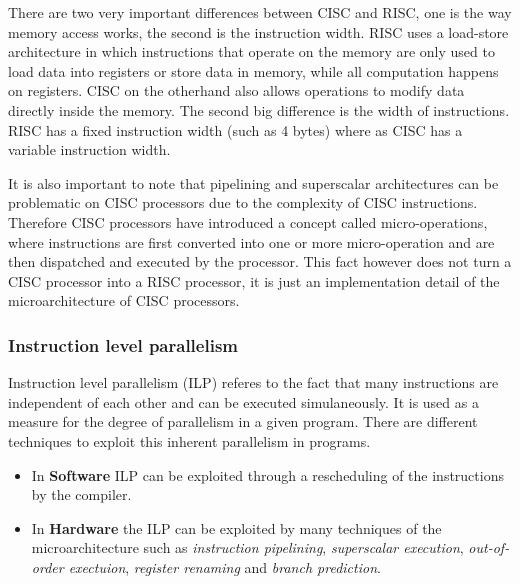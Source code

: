 \documentclass[a4paper,10pt]{article}
\begin{document}
There are two very important differences between CISC and RISC, one is the way memory access works, the second is the instruction width.
RISC uses a load-store architecture in which instructions that operate on the memory are only used to load data into registers or store
data in memory, while all computation happens on registers. CISC on the otherhand also allows operations to modify data directly inside
the memory. The second big difference is the width of instructions. RISC has a fixed instruction width (such as 4 bytes) where as CISC
has a variable instruction width.

It is also important to note that pipelining and superscalar architectures can be problematic on CISC processors due to the complexity of
CISC instructions. Therefore CISC processors have introduced a concept called micro-operations, where instructions are first converted
into one or more micro-operation and are then dispatched and executed by the processor. This fact however does not turn a CISC processor
into a RISC processor, it is just an implementation detail of the microarchitecture of CISC processors.

\subsubsection*{Instruction level parallelism}
Instruction level parallelism (ILP) referes to the fact that many instructions are independent of each other and can be
executed simulaneously. It is used as a measure for the degree of parallelism in a given program. There are different techniques to
exploit this inherent parallelism in programs.
\begin{itemize}
 \item In \textbf{Software} ILP can be exploited through a rescheduling of the instructions by the compiler.
 \item In \textbf{Hardware} the ILP can be exploited by many techniques of the microarchitecture such as \textit{instruction pipelining},
 \textit{superscalar execution}, \textit{out-of-order exectuion}, \textit{register renaming} and \textit{branch prediction}.
\end{itemize}
\end{document}
